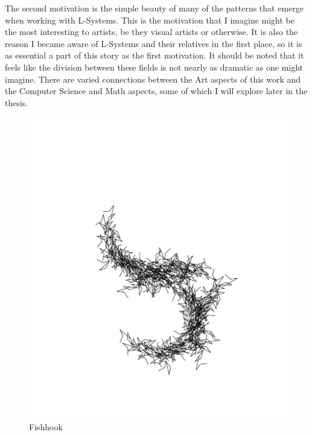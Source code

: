 \documentclass[12pt,twoside]{reedthesis}
\begin{document}
	\addtocounter{footnote}{-1}
	\addtocounter{footnote}{1}


	The second motivation is the simple beauty of many of the patterns that emerge when working with L-Systems. This is the motivation that I imagine might be the most interesting to artists, be they visual artists or otherwise. It is also the reason I became aware of L-Systems and their relatives in the first place, so it is as essential a part of this story as the first motivation. It should be noted that it feels like the division between these fields is not nearly as dramatic as one might imagine. There are varied connections between the Art aspects of this work and the Computer Science and Math aspects, some of which I will explore later in the thesis. 
	
	\begin{figure}[h!]
	\centering
	\includegraphics[clip=true, viewport=1in 1.5in 9in 8.5in, scale=0.3]{Images/Motivations2}
	\caption[Fishhook]{Fishhook\footnotemark}
	\label {Motivations2}
	\end{figure}
	
\end{document}

